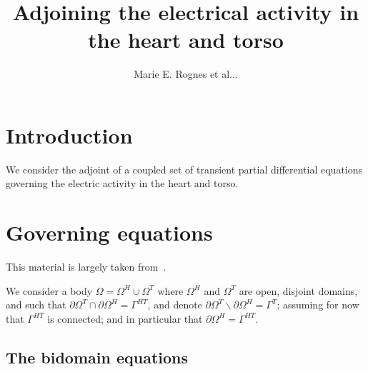 \documentclass[a4paper, reqno]{amsart}
\title{Adjoining the electrical activity in the heart and torso}
\author{Marie E. Rognes et al...}
\numberwithin{equation}{section}
\newcommand{\heart}{\Omega^H}
\newcommand{\torso}{\Omega^T}
\begin{document}
\begin{abstract}
\end{abstract}

\maketitle

\renewcommand{\thefootnote}{\arabic{footnote}}


\section{Introduction}

We consider the adjoint of a coupled set of transient partial
differential equations governing the electric activity in the heart
and torso.

\section{Governing equations}

This material is largely taken from~\cite{book:SundnesEtAl2006}.

We consider a body $\Omega = \heart \cup \torso$ where $\heart$ and
$\torso$ are open, disjoint domains, and such that $\partial \torso
\cap \partial \heart = \Gamma^{HT}$, and denote $\partial \torso
\backslash \partial \heart = \Gamma^T$; assuming for now that
$\Gamma^{HT}$ is connected; and in particular that $\partial \heart =
\Gamma^{HT}$.

\subsection{The bidomain equations}
\end{document}
